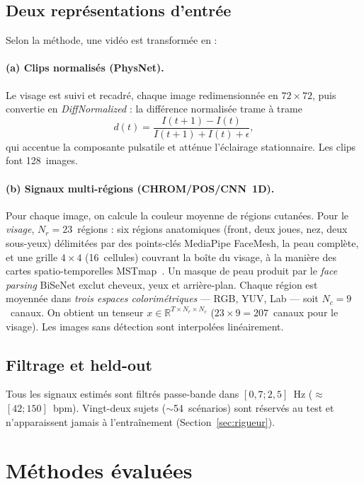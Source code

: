 \documentclass[11pt]{article}
\begin{document}
\subsection{Deux représentations d'entrée}
Selon la méthode, une vidéo est transformée en :

\paragraph{(a) Clips normalisés (PhysNet).} Le visage est suivi et recadré, chaque
image redimensionnée en $72\times72$, puis convertie en \emph{DiffNormalized} : la
différence normalisée trame à trame
\begin{equation}
d(t) = \frac{I(t+1) - I(t)}{I(t+1) + I(t) + \epsilon},
\end{equation}
qui accentue la composante pulsatile et atténue l'éclairage stationnaire. Les clips
font 128~images.

\paragraph{(b) Signaux multi-régions (CHROM/POS/CNN~1D).} Pour chaque image, on
calcule la couleur moyenne de régions cutanées. Pour le \emph{visage},
$N_r = 23$~régions : six régions anatomiques (front, deux joues, nez, deux
sous-yeux) délimitées par des points-clés MediaPipe FaceMesh, la peau complète, et
une grille $4\times4$ (16~cellules) couvrant la boîte du visage, à la manière des
cartes spatio-temporelles MSTmap~\cite{niu2020}. Un masque de peau produit par le
\emph{face parsing} BiSeNet exclut cheveux, yeux et arrière-plan. Chaque région est
moyennée dans \emph{trois espaces colorimétriques} --- RGB, YUV, Lab --- soit
$N_c = 9$~canaux. On obtient un tenseur $x \in \mathbb{R}^{T \times N_r \times N_c}$
($23\times9 = 207$~canaux pour le visage). Les images sans détection sont interpolées
linéairement.

\subsection{Filtrage et held-out}
Tous les signaux estimés sont filtrés passe-bande dans $[0{,}7;2{,}5]$~Hz
($\approx$$[42;150]$~bpm). Vingt-deux sujets ($\sim$54~scénarios) sont réservés au
test et n'apparaissent jamais à l'entraînement (Section~\ref{sec:rigueur}).

\section{Méthodes évaluées}
\label{sec:methodes}
\end{document}
